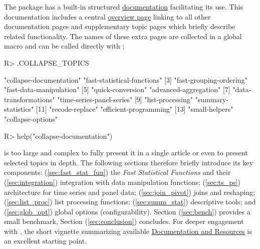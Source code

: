 \documentclass[article]{jss}
\begin{document}
The package has a built-in structured \href{https://sebkrantz.github.io/collapse/reference/collapse-documentation.html}{documentation} facilitating its use. This documentation includes a central \href{https://sebkrantz.github.io/collapse/reference/collapse-documentation.html}{overview page} linking to all other documentation pages and supplementary topic pages which briefly describe related functionality. The names of these extra pages are collected in a global macro  and can be called directly with :
%
\begin{Schunk}
\begin{Sinput}
R> .COLLAPSE_TOPICS
\end{Sinput}
\begin{Soutput}
 [1] "collapse-documentation"     "fast-statistical-functions"
 [3] "fast-grouping-ordering"     "fast-data-manipulation"    
 [5] "quick-conversion"           "advanced-aggregation"      
 [7] "data-transformations"       "time-series-panel-series"  
 [9] "list-processing"            "summary-statistics"        
[11] "recode-replace"             "efficient-programming"     
[13] "small-helpers"              "collapse-options"          
\end{Soutput}
\begin{Sinput}
R> help("collapse-documentation")
\end{Sinput}
\end{Schunk}
%
 is too large and complex to fully present it in a single article or even to present selected topics in depth. The following sections therefore briefly introduce its key components: (\ref{sec:fast_stat_fun}) the \emph{Fast Statistical Functions} and their (\ref{sec:integration}) integration with data manipulation functions; (\ref{sec:ts_ps}) architecture for time series and panel data; (\ref{sec:join_pivot}) joins and reshaping; (\ref{sec:list_proc}) list processing functions; (\ref{sec:summ_stat}) descriptive tools; and (\ref{sec:glob_opt}) global options (configurability). Section (\ref{sec:bench}) provides a small benchmark, Section (\ref{sec:conclusion}) concludes. For deeper engagement with , the short vignette summarizing available \href{https://sebkrantz.github.io/collapse/articles/collapse_documentation.html}{Documentation and Resources} is an excellent starting point.
%
\end{document}
